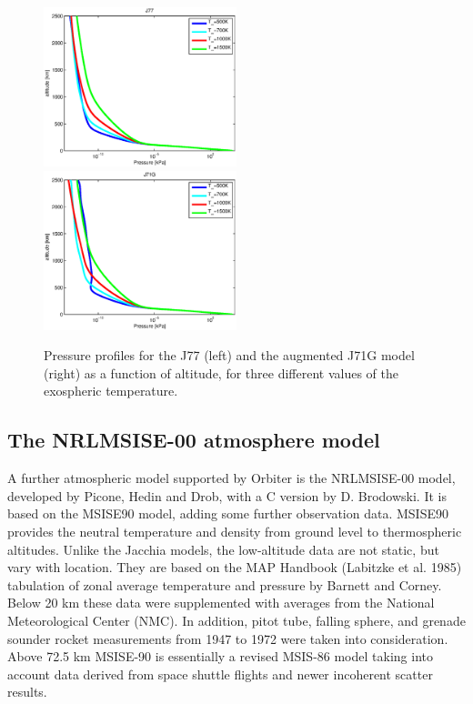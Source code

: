 \documentclass[Orbiter Technical Reference.tex]{subfiles}
\begin{document}
\begin{figure}
\includegraphics[width=0.5\textwidth]{prs_j77.eps}
\includegraphics[width=0.5\textwidth]{prs_j71g.eps}
\caption{Pressure profiles for the J77 (left) and the augmented J71G model (right) as a function of altitude, for three different values of the exospheric temperature.}
\label{fig:pressure}
\end{figure}

\subsection{The NRLMSISE-00 atmosphere model}
A further atmospheric model supported by Orbiter is the NRLMSISE-00 model, developed by Picone, Hedin and Drob, with a C version by D. Brodowski. It is based on the MSISE90 model, adding some further observation data. MSISE90 provides the neutral temperature and density from ground level to thermospheric altitudes. Unlike the Jacchia models, the low-altitude data are not static, but vary with location. They are based on the MAP Handbook (Labitzke et al. 1985) tabulation of zonal average temperature and pressure by Barnett and Corney. Below 20 km these data were supplemented with averages from the National Meteorological Center (NMC). In addition, pitot tube, falling sphere, and grenade sounder rocket measurements from 1947 to 1972 were taken into consideration. Above 72.5 km MSISE-90 is essentially a revised MSIS-86 model taking into account data derived from space shuttle flights and newer incoherent scatter results.
\end{document}
